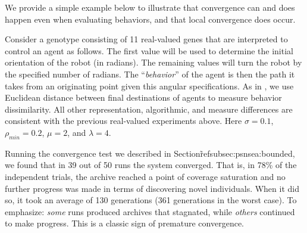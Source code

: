 \documentclass[twoside]{article}
\begin{document}
{%
%  
%
%
We provide a simple example below to illustrate that convergence can and does happen even when evaluating behaviors, and that local convergence does occur.

Consider a genotype consisting of 11 real-valued genes that are interpreted to control an agent as follows.  The first value will be used to determine the initial orientation of the robot (in radians).  The remaining values will turn the robot by the specified number of radians.  The ``\emph{behavior}'' of the agent is then the path it takes from an originating point given this angular specifications.  As in \citet{LehmanStanley2008ssls}, we use Euclidean distance between final destinations of agents to measure behavior dissimilarity.  All other representation, algorithmic, and measure differences are consistent with the previous real-valued experiments above.  Here $\sigma=0.1$, $\rho_{min} = 0.2$, $\mu=2$, and $\lambda=4$.

Running the convergence test we described in Section\~ref{subsec:psnsea:bounded}, we found that in 39 out of 50 runs the system converged.  That is, in 78\% of the independent trials, the archive reached a point of coverage saturation and no further progress was made in terms of discovering novel individuals.  When it did so, it took an average of 130 generations (361 generations in the worst case).  To emphasize:  \emph{some} runs produced archives that stagnated, while \emph{others} continued to make progress.  This is a classic sign of premature convergence.

}
\end{document}
